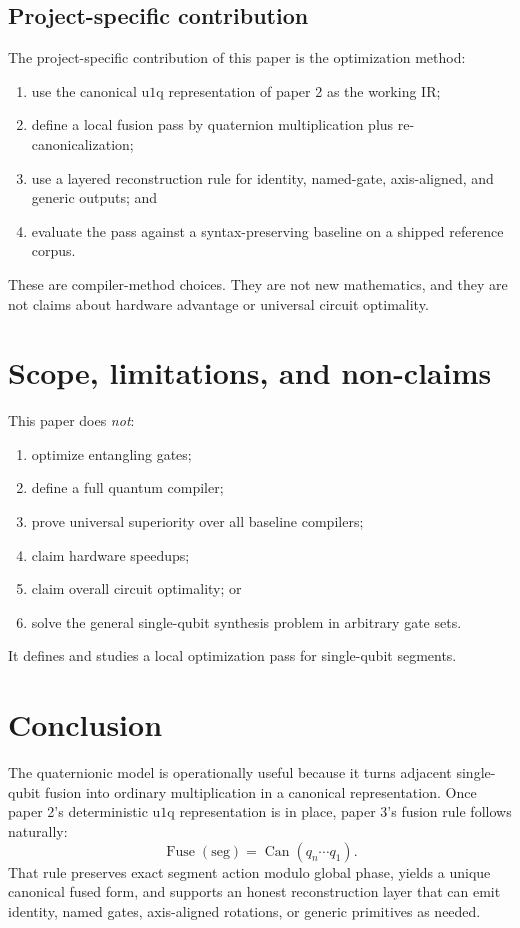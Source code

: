 \documentclass[11pt]{article}
\theoremstyle{remark}
\newcommand{\uoneq}{\mathrm{u1q}}
\newcommand{\canon}{\operatorname{Can}}
\newcommand{\Fuse}{\operatorname{Fuse}}
\begin{document}
\subsection{Project-specific contribution}

The project-specific contribution of this paper is the optimization method:
\begin{enumerate}[label=(\alph*), leftmargin=1.5em]
\item use the canonical $\uoneq$ representation of paper 2 as the working IR;
\item define a local fusion pass by quaternion multiplication plus
re-canonicalization;
\item use a layered reconstruction rule for identity, named-gate, axis-aligned,
and generic outputs; and
\item evaluate the pass against a syntax-preserving baseline on a shipped
reference corpus.
\end{enumerate}

These are compiler-method choices. They are not new mathematics, and they are
not claims about hardware advantage or universal circuit optimality.

\section{Scope, limitations, and non-claims}

This paper does \emph{not}:
\begin{enumerate}[label=(\arabic*), leftmargin=1.5em]
\item optimize entangling gates;
\item define a full quantum compiler;
\item prove universal superiority over all baseline compilers;
\item claim hardware speedups;
\item claim overall circuit optimality; or
\item solve the general single-qubit synthesis problem in arbitrary gate sets.
\end{enumerate}

It defines and studies a local optimization pass for single-qubit segments.

\section{Conclusion}

The quaternionic model is operationally useful because it turns adjacent
single-qubit fusion into ordinary multiplication in a canonical representation.
Once paper 2's deterministic $\uoneq$ representation is in place, paper 3's
fusion rule follows naturally:
\[
\Fuse(\mathrm{seg})=\canon(q_n\cdots q_1).
\]
That rule preserves exact segment action modulo global phase, yields a unique
canonical fused form, and supports an honest reconstruction layer that can emit
identity, named gates, axis-aligned rotations, or generic primitives as needed.
\end{document}
